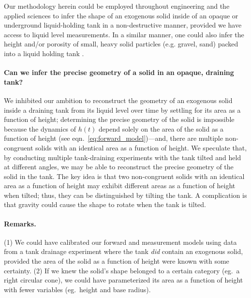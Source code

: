 \documentclass[openacc]{rsproca_new}%
\begin{document}
Our methodology herein could be employed throughout engineering and the applied sciences to infer the shape of an exogenous solid inside of an opaque or underground \cite{gephart2010short} liquid-holding tank in a non-destructive manner, provided we have access to liquid level measurements.
In a similar manner, one could also infer the height and/or porosity of small, heavy solid particles (e.g. gravel, sand) packed into a liquid holding tank \cite{guellouz2020estimation}.

\paragraph{Can we infer the precise geometry of a solid in an opaque, draining tank?}
We inhibited our ambition to reconstruct the geometry of an exogenous solid inside a draining tank from its liquid level over time by settling for its area as a function of height; determining the precise geometry of the solid is impossible because the dynamics of $h(t)$ depend solely on the area of the solid as a function of height (see eqn.~\ref{eq:forward_model})---and, there are multiple non-congruent solids with an identical area as a function of height. We speculate that, by conducting multiple tank-draining experiments with the tank tilted and held at different angles, we may be able to reconstruct the precise geometry of the solid in the tank. The key idea is that two non-congruent solids with an identical area as a function of height may exhibit different areas as a function of height when tilted; thus, they can be distinguished by tilting the tank. A complication is that gravity could cause the shape to rotate when the tank is tilted. 


\paragraph{Remarks.} (1) We could have calibrated our forward and measurement models using data from a tank drainage experiment where the tank \emph{did} contain an exogenous solid, provided the area of the solid as a function of height were known with some certainty. (2) If we knew the solid's shape belonged to a certain category (eg.\ a right circular cone), we could have parameterized its area as a function of height with fewer variables (eg.\ height and base radius). 
\end{document}
